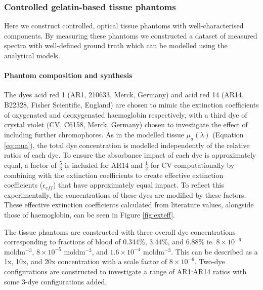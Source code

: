 \subsubsection{Controlled gelatin-based tissue phantoms}\label{sec:methodsphantoms}
Here we construct controlled, optical tissue phantoms with well-characterised components. By measuring these phantoms we constructed a dataset of measured spectra with well-defined ground truth which can be modelled using the analytical models.

\paragraph{Phantom composition and synthesis}\label{sec:methodsphantomcomposition}

The dyes acid red 1 (AR1, 210633, Merck, Germany) and acid red 14 (AR14, B22328, Fisher Scientific, England) are chosen to mimic the extinction coefficients of oxygenated and deoxygenated haemoglobin respectively, with a third dye of crystal violet (CV, C6158, Merck, Germany) chosen to investigate the effect of including further chromophores. As in the modelled tissue $\mu_a(\lambda)$ (Equation \eqref{eq:mua}), the total dye concentration is modelled independently of the relative ratios of each dye. To ensure the absorbance impact of each dye is approximately equal, a factor of $\frac{5}{3}$ is included for AR14 and $\frac{1}{2}$ for CV computationally by combining with the extinction coefficients to create effective extinction coefficients ($\epsilon_{eff}$) that have approximately equal impact. To reflect this experimentally, the concentrations of these dyes are modified by these factors. These effective extinction coefficients calculated from literature values\cite{PhotochemCAD}, alongside those of haemoglobin\cite{Prahl1998}, can be seen in Figure \ref{fig:exteff}. 

The tissue phantoms are constructed with three overall dye concentrations corresponding to fractions of blood of 0.344\%, 3.44\%, and 6.88\% ie. $8\times10^{-6}$ moldm$^{-3}$, $8\times10^{-5}$ moldm$^{-3}$, and $1.6\times10^{-4}$ moldm$^{-3}$. This can be described as a 1x, 10x, and 20x concentration with a scale factor of $8\times10^{-6}$.
Two-dye configurations are constructed to investigate a range of AR1:AR14 ratios with some 3-dye configurations added. 

